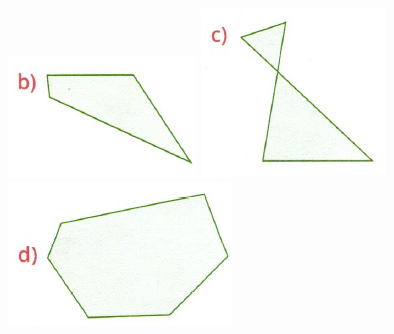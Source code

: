 \documentclass[a4paper,14pt]{article}
\begin{document}
\begin{multicols}{2}
\begin{enumerate}
			\includegraphics[width=1\linewidth]{6FMA88_imagens/imagem2}
			\includegraphics[width=1\linewidth]{6FMA88_imagens/imagem3}
			\includegraphics[width=1\linewidth]{6FMA88_imagens/imagem4}

\end{enumerate}
\end{multicols}
\end{document}
